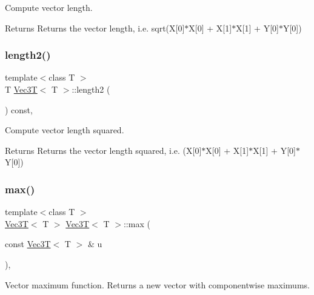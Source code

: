 Compute vector length. 

\begin{DoxyReturn}{Returns}
Returns the vector length, i.\+e. sqrt(X\mbox{[}0\mbox{]}$\ast$X\mbox{[}0\mbox{]} + X\mbox{[}1\mbox{]}$\ast$X\mbox{[}1\mbox{]} + Y\mbox{[}0\mbox{]}$\ast$Y\mbox{[}0\mbox{]}) 
\end{DoxyReturn}
\mbox{\label{classVec3T_aaed89aee434cfa0abd86fe33bff49b4e}} 
\subsubsection{\texorpdfstring{length2()}{length2()}}
{\footnotesize\ttfamily template$<$class T $>$ \\
T \hyperlink{classVec3T}{Vec3T}$<$ T $>$\+::length2 (\begin{DoxyParamCaption}{ }\end{DoxyParamCaption}) const\hspace{0.3cm}{\ttfamily [inline]}, {\ttfamily [noexcept]}}



Compute vector length squared. 

\begin{DoxyReturn}{Returns}
Returns the vector length squared, i.\+e. (X\mbox{[}0\mbox{]}$\ast$X\mbox{[}0\mbox{]} + X\mbox{[}1\mbox{]}$\ast$X\mbox{[}1\mbox{]} + Y\mbox{[}0\mbox{]}$\ast$Y\mbox{[}0\mbox{]}) 
\end{DoxyReturn}
\mbox{\label{classVec3T_ac126bbdaeff79e475327887bfa8aa62c}} 
\subsubsection{\texorpdfstring{max()}{max()}}
{\footnotesize\ttfamily template$<$class T $>$ \\
\hyperlink{classVec3T}{Vec3T}$<$ T $>$ \hyperlink{classVec3T}{Vec3T}$<$ T $>$\+::max (\begin{DoxyParamCaption}\item[{const \hyperlink{classVec3T}{Vec3T}$<$ T $>$ \&}]{u }\end{DoxyParamCaption})\hspace{0.3cm}{\ttfamily [inline]}, {\ttfamily [noexcept]}}



Vector maximum function. Returns a new vector with componentwise maximums. 


